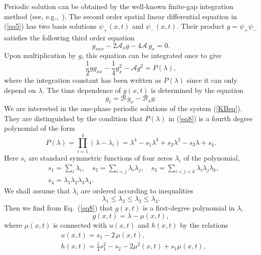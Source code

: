 \documentclass[pre,aps,superscriptaddress,twocolumn,floatfix]{revtex4-1}
\newcommand{\la}{\lambda}
\begin{document}
Periodic solution can be obtained by the well-known finite-gap integration method
(see, e.g.,~\cite{Kamchatnov-2000}).  The second order spatial linear differential
equation in (\ref{eq5})
has two basis solutions  $\psi _{+}(x,t)$ and $\psi_{-}(x,t)$.
Their product $g=\psi _{+}\psi_{-} $ satisfies the
following third order equation
\begin{equation}\label{eq7}
g_{xxx}-2\mathcal{A}_xg-4\mathcal{A}\, g_x=0.
\end{equation}
Upon multiplication by $g$, this equation can be integrated once to
give
\begin{equation}\label{eq8}
\frac12 gg_{xx}-\frac14 g_x^2-\mathcal{A}g^2=P(\la),
\end{equation}
where the integration constant has been written as $P(\lambda )$ since
it can only depend on $\lambda$.  The time dependence of $g(x,t)$ is
determined by the equation
\begin{equation}\label{eq9}
g_{t}=\mathcal{B}\,g_x-\mathcal{B}_xg.
\end{equation}
We are interested in the one-phase periodic solutions of the system
(\ref{KBeq}). They are distinguished by the condition that $P(\lambda
)$ in (\ref{eq8}) is a fourth degree polynomial of the
form
\begin{equation}\label{eq10}
P(\lambda )=\prod_{i=1}^{4}(\lambda -\lambda _{i})=\lambda^{4}-
s_{1}\lambda^{3}+s_{2}\lambda ^{2}-s_{3}\lambda +s_{4}.
\end{equation}
Here $s_i$ are standard symmetric functions of four zeros $\lambda_i$
of the polynomial,
\begin{equation}\label{}
\begin{split}
& s_1=\sum_i\lambda_i,\quad s_2=\sum_{i<j}\lambda_i\lambda_j,
\quad s_3=\sum_{i<j<k}\lambda_i\lambda_j\lambda_k, \\
& s_4=\lambda_1\lambda_2\lambda_3\lambda_4.
\end{split}
\end{equation}
We shall assume that $\la_i$ are ordered according to inequalities
\begin{equation}\label{eq10a}
\la_1\leq\la_2\leq\la_3\leq\la_4.
\end{equation}
Then we find from Eq.~(\ref{eq8}) that $g(x,t)$ is a first-degree
polynomial in $\lambda$, 
\begin{equation}\label{eq11}
g(x,t)=\lambda -\mu (x,t),
\end{equation}
where $\mu (x,t)$ is connected with $u(x,t)$ and $h(x,t)$ by the
relations
\begin{equation}\label{eq12}
\begin{split}
& u(x,t)=s_{1}-2\, \mu (x,t),\\
& h(x,t)=\frac{1}{4}s_{1}^{2}-s_{2}-2\mu^{2}(x,t)
+s_{1}\mu(x,t) ,\end{split}
\end{equation}
\end{document}
